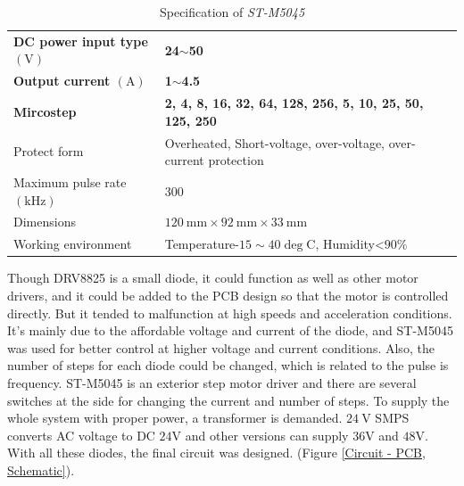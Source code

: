 \begin{table}[H]
    \centering
    \captionsetup{justification=centering}
    \begin{tabular}{ll}
        \hline
        \textbf{DC power input type $(\mathrm{V})$}  & \textbf{24$\sim$50}      \\
        \textbf{Output current $(\mathrm{A})$}       & \textbf{1$\sim$4.5}      \\
        \textbf{Mircostep}           & \textbf{2, 4, 8, 16, 32, 64, 128, 256, 5, 10, 25, 50, 125, 250               }                \\
        Protect form        & Overheated, Short-voltage, over-voltage, over-current protection \\
        Maximum pulse rate $(\mathrm{kHz})$ & 300             \\
        Dimensions               & $120\mathrm{~mm}\times92\mathrm{~mm}\times33\mathrm{~mm}$ \\
        Working environment & Temperature-$15\sim40\mathrm{\deg C}$, Humidity\textless{}$90\%$ \\ 
        \hline
    \end{tabular}
    \caption{Specification of \textit{ST-M5045}}
    \label{Specification of ST-M5045}
\end{table}

Though DRV8825 is a small diode, it could function as well as other motor drivers, and it could be added to the PCB design so that the motor is controlled directly. But it tended to malfunction at high speeds and acceleration conditions. It's mainly due to the affordable voltage and current of the diode, and ST-M5045 was used for better control at higher voltage and current conditions. Also, the number of steps for each diode could be changed, which is related to the pulse is frequency. ST-M5045 is an exterior step motor driver and there are several switches at the side for changing the current and number of steps. To supply the whole system with proper power, a transformer is demanded. $24\mathrm{~V}$ SMPS converts AC voltage to DC $24\mathrm{V}$ and other versions can supply $36\mathrm{V}$ and $48\mathrm{V}$. With all these diodes, the final circuit was designed. (Figure \ref{Circuit - PCB, Schematic}).


